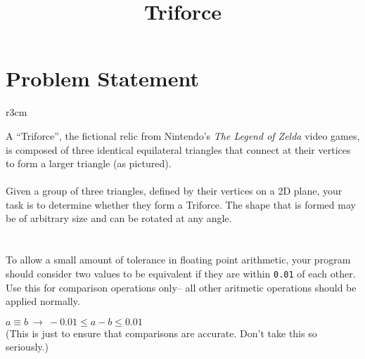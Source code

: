\documentclass[11pt]{article}
\title{\textbf{Triforce}}
\date{}
\begin{document}
\maketitle

\section{Problem Statement}

\begin{wrapfigure}{r}{3cm}
\end{wrapfigure}
A ``Triforce'', the fictional relic from Nintendo's \emph{The Legend of Zelda}
video games, is composed of three identical equilateral triangles that connect
at their vertices to form a larger triangle (as pictured).
\\\\
Given a group of three triangles, defined by their vertices on a 2D plane,
your task is to determine whether they form a Triforce. The shape that is
formed may be of arbitrary size and can be rotated at any angle.\\
\\\\
To allow a small amount of tolerance in floating point arithmetic,
your program should consider two values to be equivalent if they are within
\texttt{0.01} of each other. Use this for comparison operations only-- all other
aritmetic operations should be applied normally.
\begin{center}
$a \equiv b\ \rightarrow\ -0.01 \le a - b \le 0.01$
\\\bigskip
\small(This is just to ensure that comparisons are accurate. Don't take this
so seriously.)
\end{center}
\end{document}
